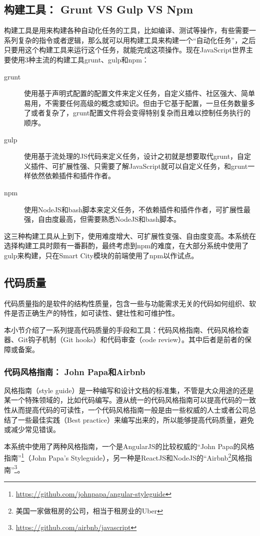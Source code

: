 \subsection{构建工具： Grunt VS Gulp VS Npm}
构建工具是用来构建各种自动化任务的工具，比如编译、测试等操作，有些需要一系列复杂的指令或者逻辑，那么就可以用构建工具来构建一个“自动化任务”，之后只要用这个构建工具来运行这个任务，就能完成这项操作。现在JavaScript世界主要使用3种主流的构建工具grunt、gulp和npm：
\begin{description}
  \item[grunt] 使用基于声明式配置的配置文件来定义任务，自定义插件、社区强大、简单易用，不需要任何高级的概念或知识。但由于它基于配置，一旦任务数量多了或者复杂了，grunt配置文件将会变得特别复杂而且难以控制任务执行的顺序。
  \item[gulp] 使用基于流处理的JS代码来定义任务，设计之初就是想要取代grunt，自定义插件、可扩展性强、只需要了解JavaScript就可以自定义任务，和grunt一样依然依赖插件和插件作者。
  \item[npm] 使用NodeJS和bash脚本来定义任务，不依赖插件和插件作者，可扩展性最强，自由度最高，但需要熟悉NodeJS和bash脚本。
\end{description}

这三种构建工具从上到下，使用难度增大、可扩展性变强、自由度变高。本系统在选择构建工具时颇有一番斟酌，最终考虑到npm的难度，在大部分系统中使用了gulp来构建，只在Smart City模块的前端使用了npm以作试点。

\subsection{代码质量}
代码质量指的是软件的结构性质量，包含一些与功能需求无关的代码如何组织、软件是否正确生产的特性，如可读性、健壮性和可维护性。

本小节介绍了一系列提高代码质量的手段和工具：代码风格指南、代码风格检查器、Git钩子机制（Git hooks）和代码审查（code review）。其中后者是前者的保障或备案。
\subsubsection{代码风格指南： John Papa和Airbnb}
风格指南（style guide）是一种编写和设计文档的标准集，不管是大众用途的还是某一个特殊领域的，比如代码编写。遵从统一的代码风格指南可以提高代码的一致性从而提高代码的可读性，一个代码风格指南一般是由一些权威的人士或者公司总结了一些最佳实践（Best practice）来编写出来的，所以能够提高代码质量，避免或减少常见错误。

本系统中使用了两种风格指南，一个是AngularJS的比较权威的“John Papa的风格指南”\footnote{\url{https://github.com/johnpapa/angular-styleguide}}（John Papa's Styleguide），另一种是ReactJS和NodeJS的“Airbnb\footnote{美国一家做租房的公司，相当于租房业的Uber}风格指南”\footnote{\url{https://github.com/airbnb/javascript}}。

